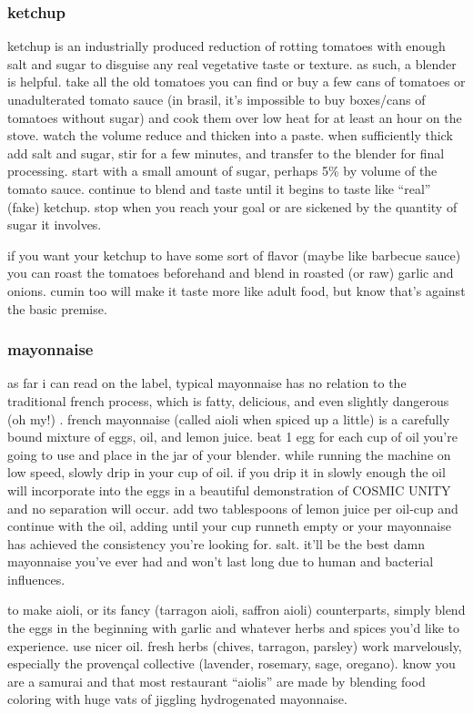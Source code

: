 \subsubsection{ketchup}

ketchup is an industrially produced reduction of rotting tomatoes with enough 
salt and sugar to disguise any real vegetative taste or texture. as such, a 
blender is helpful. take all the old tomatoes you can find or buy a few cans 
of tomatoes or unadulterated tomato sauce (in brasil, it's impossible to buy 
boxes/cans of tomatoes without sugar) and cook them over low heat for at least 
an hour on the stove. watch the volume reduce and thicken into a paste. when 
sufficiently thick add salt and sugar, stir for a few minutes, and transfer to 
the blender for final processing. start with a small amount of sugar, perhaps 
5\% by volume of the tomato sauce. continue to blend and taste until it begins 
to taste like ``real'' (fake) ketchup. stop when you reach your goal or are 
sickened by the quantity of sugar it involves.

if you want your ketchup to have some sort of flavor (maybe like barbecue 
sauce) you can roast the tomatoes beforehand and blend in roasted (or raw) 
garlic and onions. cumin too will make it taste more like adult food, but know 
that's against the basic premise.

\subsubsection{mayonnaise}

as far i can read on the label, typical mayonnaise has no relation to the 
traditional french process, which is fatty, delicious, and even slightly 
dangerous (oh my!) . french mayonnaise (called aioli when spiced up a little) 
is a carefully bound mixture of eggs, oil, and lemon juice. beat 1 egg for 
each cup of oil you're going to use and place in the jar of your blender. 
while running the machine on low speed, slowly drip in your cup of oil. if you 
drip it in slowly enough the oil will incorporate into the eggs in a beautiful 
demonstration of COSMIC UNITY and no separation will occur. add two 
tablespoons of lemon juice per oil-cup and continue with the oil, adding until 
your cup runneth empty or your mayonnaise has achieved the consistency you're 
looking for. salt. it'll be the best damn mayonnaise you've ever had and won't 
last long due to human and bacterial influences.

to make aioli, or its fancy (tarragon aioli, saffron aioli) counterparts, 
simply blend the eggs in the beginning with garlic and whatever herbs and 
spices you'd like to experience. use nicer oil. fresh herbs (chives, tarragon, 
parsley) work marvelously, especially the proven\c{c}al collective (lavender, 
rosemary, sage, oregano). know you are a samurai and that most restaurant 
``aiolis'' are made by blending food coloring with huge vats of jiggling 
hydrogenated mayonnaise.

